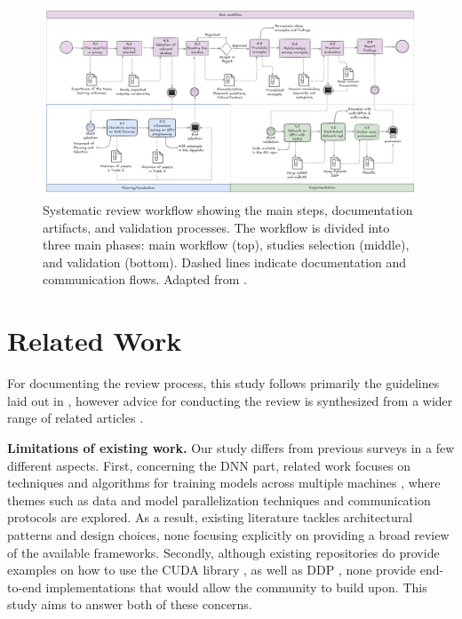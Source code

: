 
\begin{figure}[th]
	\centering
	\includegraphics[width=\linewidth]{figures/workflow2}
	\caption{Systematic review workflow showing the main steps, documentation artifacts, and validation processes.
		The workflow is divided into three main phases: main workflow (top), studies selection (middle), and
		validation (bottom). Dashed lines indicate documentation and communication flows. Adapted from \cite{dos_santos_sustainable_2024}.}
	\label{fig:workflow}
\end{figure}

\section{Related Work}
\label{sec:related_work}
For documenting the review process, this study follows primarily the guidelines laid out in
\cite{keele_systematic_2007}, however advice for conducting the review is synthesized from a wider
range of related articles
\cite{brereton_lessons_2007-1,kitchenham_procedures_nodate,budgen_reporting_2018,dos_santos_sustainable_2024}.

\textbf{Limitations of existing work.}
Our study differs from previous surveys in a few different aspects. First, concerning the DNN part,
related work focuses on techniques and algorithms for training models across multiple machines
\cite{dehghani_distributed_2023, chahal_hitchhikers_2018, berloco_systematic_2022}, where themes
such as data and model parallelization techniques and communication protocols are explored. As a
result, existing literature tackles architectural patterns and design choices, none focusing
explicitly on providing a broad review of the available frameworks. Secondly, although existing
repositories do provide examples on how to use the CUDA library
\cite{noauthor_nvidiacuda-samples_2025}, as well as DDP
\cite{noauthor_examplesdistributedddpreadmemd_nodate}, none provide end-to-end implementations that
would allow the community to build upon. This study aims to answer both of these concerns.

